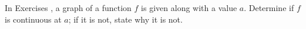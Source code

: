 {\noindent In Exercises}
{, a graph of a function $f$ is given along with a value $a$. Determine if $f$ is continuous at $a$; if it is not, state why it is not.}
